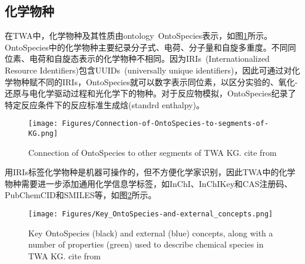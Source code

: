 \subsection{化学物种}
在\textrm{TWA}中，化学物种及其性质由\textrm{ontology~OntoSpecies}表示，如图\ref{Fig:OntoSpecies-to-segments-TWA}所示。\textrm{OntoSpecies}中的化学物种主要纪录分子式、电荷、分子量和自旋多重度。不同同位素、电荷和自旋态表示的化学物种不相同。因为\textrm{IRIs~(Internationalized Resource Identifiers)}包含\textrm{UUIDs~(universally unique identifiers)}，因此可通过对化学物种赋不同的\textrm{IRIs}，\textrm{OntoSpecies}就可以数字表示同位素，以区分实验的、氧化-还原与电化学驱动过程和光化学下的物种。对于反应物模拟，\textrm{OntoSpecies}纪录了特定反应条件下的反应标准生成焓\textrm{(standrd enthalpy)}。
\begin{figure}[h!]
\centering
\texttt{[image: Figures/Connection-of-OntoSpecies-to-segments-of-KG.png]}
\caption{\small\textrm{Connection of OntoSpecies to other segments of TWA KG. cite from\cite{ACR56-128_2023}}}%
\label{Fig:OntoSpecies-to-segments-TWA}
\end{figure}

用\textrm{IRIs}标签化学物种是机器可操作的，但不方便化学家识别，因此\textrm{TWA}中的化学物种需要进一步添加通用化学信息学标签，如\textrm{\textrm{InChI}}、\textrm{InChIKey}和\textrm{CAS}注册码、\textrm{PubChemCID}和\textrm{SMILES}等，如图\ref{Fig:Key-OntoSpecies-and-external-concepts}所示。
\begin{figure}[h!]
\centering
\texttt{[image: Figures/Key\_OntoSpecies-and-external\_concepts.png]}
\caption{\small\textrm{Key OntoSpecies (black) and external (blue) concepts, along with a number of properties (green) used to describe chemical species in TWA KG. cite from\cite{ACR56-128_2023}}}%
\label{Fig:Key-OntoSpecies-and-external-concepts}
\end{figure}

